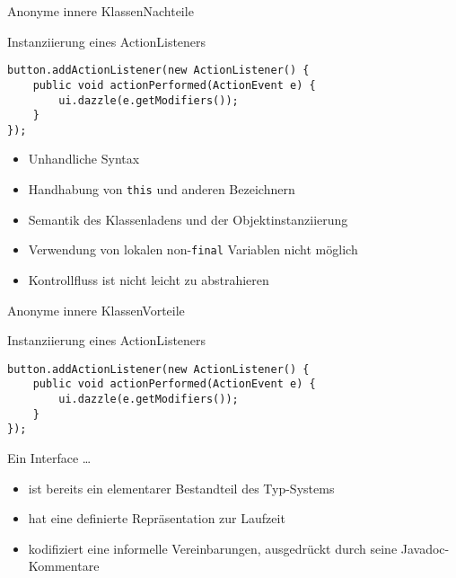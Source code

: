 \begin{frame}[fragile]{Anonyme innere Klassen}{Nachteile}

    \centering
    \begin{minipage}[b]{0.75\textwidth}
        \begin{block}{Instanziierung eines ActionListeners \citep{goetz13}}
            \begin{lstlisting}
button.addActionListener(new ActionListener() {
    public void actionPerformed(ActionEvent e) {
        ui.dazzle(e.getModifiers());
    }
});
            \end{lstlisting}
        \end{block}
    \end{minipage}

    \pause

    \begin{itemize}
        \item<2->Unhandliche Syntax
        \item<3->Handhabung von \texttt{this} und anderen Bezeichnern
        \item<4->Semantik des Klassenladens und der Objektinstanziierung
        \item<5->Verwendung von lokalen non-\texttt{final} Variablen nicht möglich
        \item<6->Kontrollfluss ist nicht leicht zu abstrahieren
    \end{itemize}
\end{frame}

\begin{frame}[fragile]{Anonyme innere Klassen}{Vorteile}

    \begin{center}
    \begin{minipage}[b]{0.75\textwidth}
        \begin{block}{Instanziierung eines ActionListeners \citep{goetz13}}
            \begin{lstlisting}
button.addActionListener(new ActionListener() {
    public void actionPerformed(ActionEvent e) {
        ui.dazzle(e.getModifiers());
    }
});
            \end{lstlisting}
        \end{block}
    \end{minipage}
    \end{center}

    \pause

    Ein Interface \dots
    \begin{itemize}
        \item<2->\textcolor<5->{dkred!70}{ist bereits ein elementarer Bestandteil des Typ-Systems}
        \item<3->hat eine definierte Repräsentation zur Laufzeit 
        \item<4->kodifiziert eine informelle Vereinbarungen, ausgedrückt durch
        seine Javadoc-Kommentare
    \end{itemize}
\end{frame}


